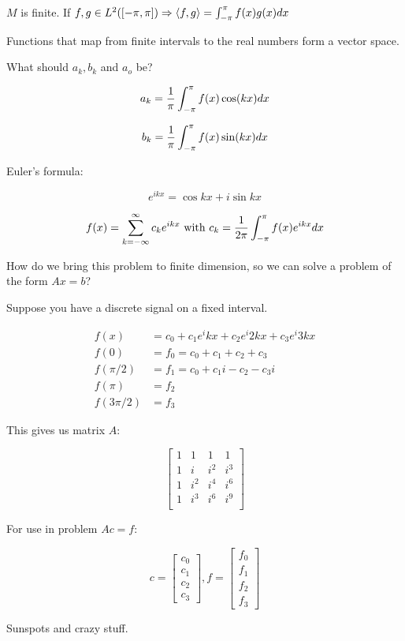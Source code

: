 $M$ is finite. If $f,g \in L^2([-\pi,\pi]) \Rightarrow \langle f,g\rangle = \int_{-\pi}^\pi f(x)g(x)dx$

Functions that map from finite intervals to the real numbers form a vector space.

What should $a_k, b_k$ and $a_o$ be?

\[
  a_k = {1 \over \pi} \int_{-\pi}^\pi f(x)\cos(kx)dx
\]

\[
  b_k = {1 \over \pi} \int_{-\pi}^\pi f(x)\sin(kx)dx
\]


Euler's formula:

\[
  e^{ikx} = \cos{kx} + i \sin{kx}
\]

\[
  f(x) = \sum_{k=-\infty}^\infty c_k e^{ikx} \text{ with } c_k = {1 \over 2\pi} \int_{-\pi}^\pi f(x) e^{ikx} dx
\]

How do we bring this problem to finite dimension, so we can solve a problem of the form $Ax=b$?

Suppose you have a discrete signal on a fixed interval.

\begin{align*}
  f(x) &= c_0 + c_1 e^ikx + c_2 e^i2kx + c_3 e^i3kx \\
  f(0) &= f_0 = c_0 + c_1 + c_2 + c_3  \\
  f(\pi/2) &= f_1 = c_0 + c_1 i - c_2 - c_3 i \\
  f(\pi) &= f_2 \\
  f(3\pi/2) &= f_3
\end{align*}

This gives us matrix $A$:

\[
  \begin{bmatrix}
    1 & 1 & 1 & 1 \\
    1 & i & i^2 & i^3 \\
    1 & i^2 & i^4 & i^6 \\
    1 & i^3 & i^6 & i^9 \\    
  \end{bmatrix}
\]

For use in problem $Ac=f$:

\[
  c = \begin{bmatrix}
    c_0 \\ c_1 \\ c_2 \\ c_3
  \end{bmatrix},
  f = \begin{bmatrix}
    f_0 \\ f_1 \\ f_2 \\ f_3
  \end{bmatrix}
\]

Sunspots and crazy stuff.

